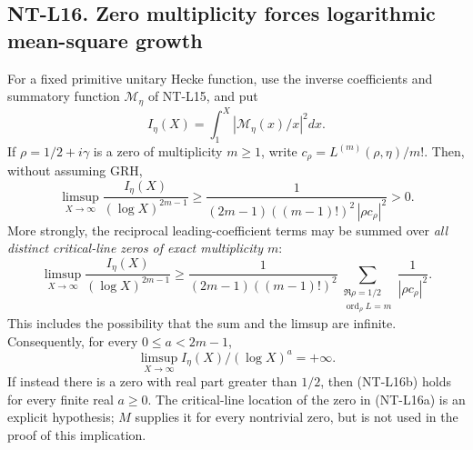 \subsection*{NT-L16. Zero multiplicity forces logarithmic mean-square growth}
For a fixed primitive unitary Hecke function, use the inverse coefficients
and summatory function $\mathcal M_\eta$ of NT-L15, and put
\[
 I_\eta(X)=\int_1^X|\mathcal M_\eta(x)/x|^2dx.
\]
If $\rho=1/2+i\gamma$ is a zero of multiplicity $m\ge1$, write
$c_\rho=L^{(m)}(\rho,\eta)/m!$. Then, without assuming GRH,
\[
 \limsup_{X\to\infty}\frac{I_\eta(X)}{(\log X)^{2m-1}}
       \ge\frac1{(2m-1)((m-1)!)^2\,|\rho c_\rho|^2}>0.
                                                        \tag{NT-L16a}
\]
More strongly, the reciprocal leading-coefficient terms may be summed
over \emph{all distinct critical-line zeros of exact multiplicity $m$}:
\[
 \limsup_{X\to\infty}\frac{I_\eta(X)}{(\log X)^{2m-1}}
 \ge\frac1{(2m-1)((m-1)!)^2}
   \sum_{\substack{\Re\rho=1/2\\ \operatorname{ord}_\rho L=m}}
            \frac1{|\rho c_\rho|^2}.                    \tag{NT-L16a'}
\]
This includes the possibility that the sum and the limsup are infinite.
Consequently, for every $0\le a<2m-1$,
\[
 \limsup_{X\to\infty}I_\eta(X)/(\log X)^a=+\infty.
                                                        \tag{NT-L16b}
\]
If instead there is a zero with real part greater than $1/2$, then
(NT-L16b) holds for every finite real $a\ge0$.
The critical-line location of the zero in (NT-L16a) is an explicit
hypothesis; $M$ supplies it for every nontrivial zero, but is not
used in the proof of this implication.

